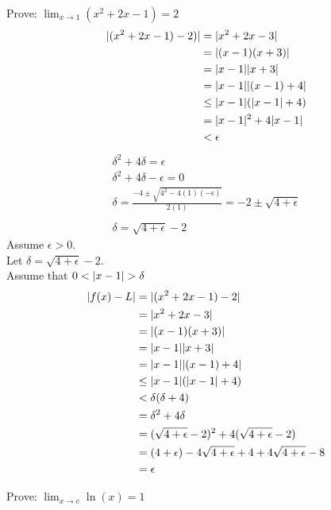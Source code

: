\documentclass[letterpaper,12pt,fleqn]{article}
\newcommand{\e}{\epsilon}
\renewcommand{\d}{\delta}
\begin{document}
\begin{example}
  Prove: \(\displaystyle\lim_{x\to1}(x^2+2x-1)=2\)
  \begin{align*}
    \abs{(x^2+2x-1)-2)} &= \abs{x^2+2x-3} \\
    &= \abs{(x-1)(x+3)} \\
    &= \abs{x-1}\abs{x+3} \\
    &= \abs{x-1}\abs{(x-1)+4} \\
    &\le \abs{x-1}(\abs{x-1}+4) \\
    &= \abs{x-1}^2+4\abs{x-1} \\
    &< \e
  \end{align*}
  \begin{gather*}
    \d^2+4\d=\e \\
    \d^2+4\d-\e=0 \\
    \d=\frac{-4\pm\sqrt{4^2-4(1)(-\e)}}{2(1)}=-2\pm\sqrt{4+\e} \\
    \\
    \d=\sqrt{4+\e}-2
  \end{gather*}
  Assume \(\e>0\). \\
  Let \(\d=\sqrt{4+\e}-2\). \\
  Assume that \(0<\abs{x-1}>\d\)
  \begin{align*}
    \abs{f(x)-L} &= \abs{(x^2+2x-1)-2} \\
    &= \abs{x^2+2x-3} \\
    &= \abs{(x-1)(x+3)} \\
    &= \abs{x-1}\abs{x+3} \\
    &= \abs{x-1}\abs{(x-1)+4} \\
    &\le \abs{x-1}(\abs{x-1}+4) \\
    &< \d(\d+4) \\
    &= \d^2+4\d \\
    &= (\sqrt{4+\e}-2)^2+4(\sqrt{4+\e}-2) \\
    &= (4+\e)-4\sqrt{4+\e}+4+4\sqrt{4+\e}-8 \\
    &= \e
  \end{align*}
\end{example}

\begin{example}
  Prove: \(\displaystyle\lim_{x\to e}\ln(x)=1\)
\end{example}
\end{document}

